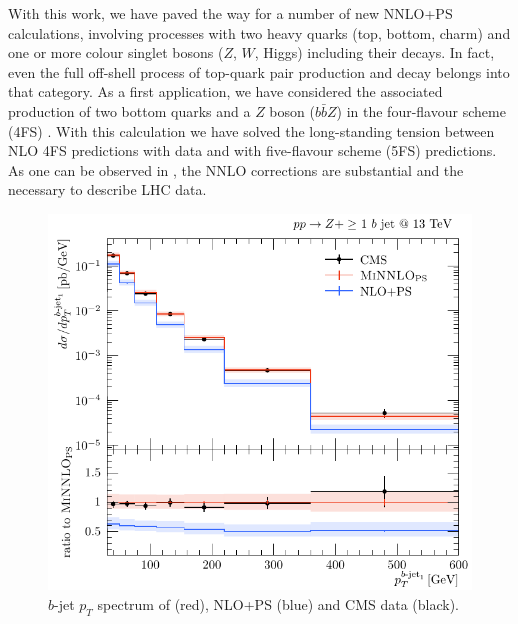 \documentclass{FBR_Bericht_2025}
\begin{document}
\begin{refsection}
With this work, we have paved the way for a number of new NNLO+PS calculations, involving processes with two heavy quarks (top, bottom, charm) 
and one or more colour singlet bosons ($Z$, $W$, Higgs) including their decays. In fact, even the full off-shell process of top-quark pair production 
and decay belongs into that category. As a first application, we have considered the associated production of two bottom quarks and a $Z$ boson ($b\bar{b}Z$)
in the four-flavour scheme (4FS) \cite{Mazzitelli:2024ura}. With this calculation we have solved the long-standing tension between NLO 4FS predictions with data 
and with five-flavour scheme (5FS) predictions. As one can be observed in , the NNLO corrections are substantial and the necessary to describe LHC data.

\begin{figure}[bh]
\begin{center}
\includegraphics[width=0.95\linewidth]{plots/bbZ_ptbjet.pdf}
\caption{$b$-jet $p_T$ spectrum of \minnlo{} (red), NLO+PS (blue) and CMS data (black).}
\label{fig:bbZ}
\end{center}
\end{figure}



\end{refsection}
\end{document}
